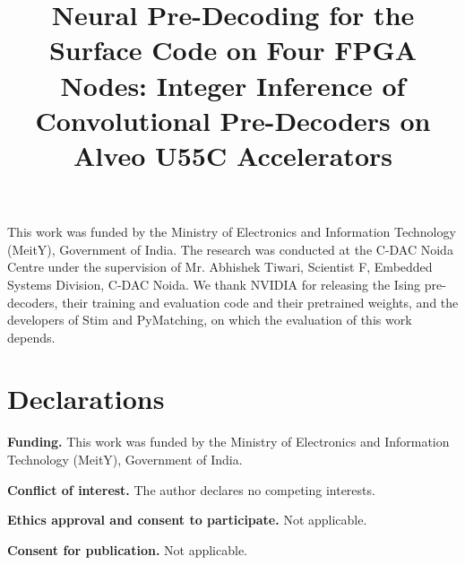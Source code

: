 \documentclass[pdflatex,sn-mathphys-num]{sn-jnl}
\begin{document}
\title[Neural Pre-Decoding on Four FPGA Nodes]{Neural Pre-Decoding for the Surface Code on Four FPGA Nodes:
Integer Inference of Convolutional Pre-Decoders on Alveo U55C Accelerators}

\author*[1]{ }


\abstract{}


\maketitle











\backmatter

This work was funded by the Ministry of Electronics and Information Technology (MeitY), Government of India. The
research was conducted at the C-DAC Noida Centre under the supervision of Mr. Abhishek Tiwari, Scientist F, Embedded
Systems Division, C-DAC Noida. We thank NVIDIA for releasing the Ising pre-decoders, their training and evaluation
code and their pretrained weights, and the developers of Stim and PyMatching, on which the evaluation of this work
depends.

\section*{Declarations}

\textbf{Funding.} This work was funded by the Ministry of Electronics and Information Technology (MeitY), Government of
India.

\textbf{Conflict of interest.} The author declares no competing interests.

\textbf{Ethics approval and consent to participate.} Not applicable.

\textbf{Consent for publication.} Not applicable.
\end{document}
